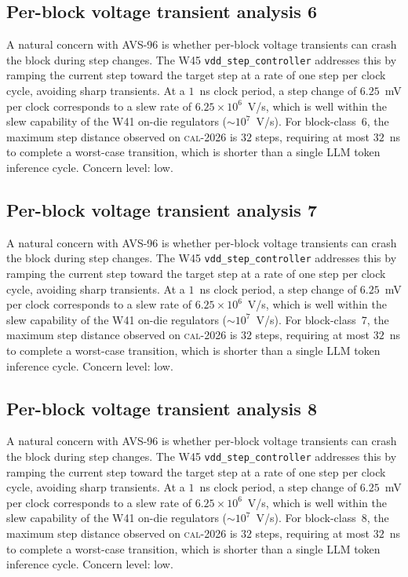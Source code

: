 \subsection{Per-block voltage transient analysis 6}

A natural concern with AVS-96 is whether per-block voltage transients
can crash the block during step changes. The W45 \texttt{vdd\_step\_controller} addresses this by ramping the current
step toward the target step at a rate of one step per clock cycle,
avoiding sharp transients. At a $1$~ns clock period, a step change of
$6.25$~mV per clock corresponds to a slew rate of $6.25\times 10^6$~V/s,
which is well within the slew capability of the W41 on-die regulators
($\sim 10^7$~V/s). For block-class~6, the maximum step distance
observed on \textsc{cal-2026} is $32$ steps, requiring at most $32$~ns
to complete a worst-case transition, which is shorter than a single
LLM token inference cycle. Concern level: low.


\subsection{Per-block voltage transient analysis 7}

A natural concern with AVS-96 is whether per-block voltage transients
can crash the block during step changes. The W45 \texttt{vdd\_step\_controller} addresses this by ramping the current
step toward the target step at a rate of one step per clock cycle,
avoiding sharp transients. At a $1$~ns clock period, a step change of
$6.25$~mV per clock corresponds to a slew rate of $6.25\times 10^6$~V/s,
which is well within the slew capability of the W41 on-die regulators
($\sim 10^7$~V/s). For block-class~7, the maximum step distance
observed on \textsc{cal-2026} is $32$ steps, requiring at most $32$~ns
to complete a worst-case transition, which is shorter than a single
LLM token inference cycle. Concern level: low.


\subsection{Per-block voltage transient analysis 8}

A natural concern with AVS-96 is whether per-block voltage transients
can crash the block during step changes. The W45 \texttt{vdd\_step\_controller} addresses this by ramping the current
step toward the target step at a rate of one step per clock cycle,
avoiding sharp transients. At a $1$~ns clock period, a step change of
$6.25$~mV per clock corresponds to a slew rate of $6.25\times 10^6$~V/s,
which is well within the slew capability of the W41 on-die regulators
($\sim 10^7$~V/s). For block-class~8, the maximum step distance
observed on \textsc{cal-2026} is $32$ steps, requiring at most $32$~ns
to complete a worst-case transition, which is shorter than a single
LLM token inference cycle. Concern level: low.


